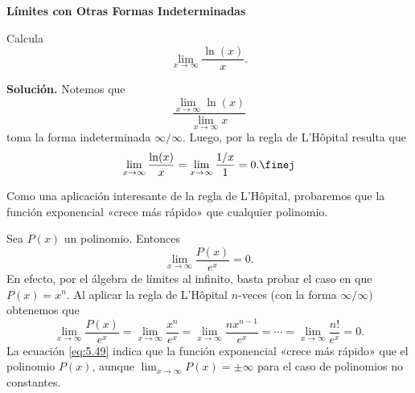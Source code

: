 \documentclass[12pt,a4paper]{book}
\newcommand{\subtitulo}[1]{\par\avoidorphan{5}\addvspace{\medskipamount}\noindent\textbf{#1}\par\nobreak}
\begin{document}
    \subtitulo{Límites con Otras Formas Indeterminadas}

    \begin{ejemplo}\label{ejm:103}
        Calcula
        \begin{equation}\label{eq:5.48}
            \lim_{x\to\infty}\frac{\ln(x)}{x}.
        \end{equation}

        \textbf{Solución.} Notemos que
        \begin{equation*}
            \frac{\lim_{x\to\infty}\ln(x)}{\lim_{x\to\infty}x}
        \end{equation*}
        toma la forma indeterminada $\infty/\infty$. Luego, por la regla de L'Hôpital resulta
        que
        \begin{equation*}
            \lim_{x\to\infty}\frac{\ln(x)}{x}=\lim_{x\to\infty}\frac{1/x}{1}=0.\finej
        \end{equation*}
    \end{ejemplo}

    Como una aplicación interesante de la regla de L'Hôpital, probaremos que
    la función exponencial «crece más rápido» que cualquier polinomio.

    \begin{ejemplo}\label{ejm:104}
        Sea $P(x)$ un polinomio. Entonces
        \begin{equation}\label{eq:5.49}
            \lim_{x\to\infty}\frac{P(x)}{e^{x}}=0.
        \end{equation}
        En efecto, por el álgebra de límites al infinito, basta probar el caso en que
        $P(x)=x^{n}$. Al aplicar la regla de L'Hôpital $n$-veces (con la forma $\infty/\infty$)
        obtenemos que
        \begin{equation*}
            \lim_{x\to\infty}\frac{P(x)}{e^{x}}=\lim_{x\to\infty}\frac{x^{n}}{e^{x}}=\lim_{x\to\infty}\frac{nx^{n-1}}{e^{x}}=\cdots=\lim_{x\to\infty}\frac{n!}{e^{x}}=0.
        \end{equation*}
        La ecuación \eqref{eq:5.49} indica que la función exponencial «crece más rápido» que
        el polinomio $P(x)$, aunque $\lim_{x\to\infty}P(x)=\pm\infty$ para el caso de polinomios
        no constantes.
    \end{ejemplo}
\end{document}

